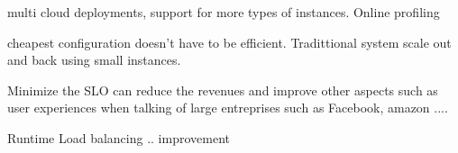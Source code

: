 multi cloud deployments, support for more types of instances.
Online profiling

cheapest configuration doesn't have to be efficient. Tradittional system scale out and back using small instances.

Minimize the SLO can reduce the revenues and improve other aspects such as user experiences when talking of large entreprises such as Facebook, amazon ....

Runtime Load balancing .. improvement
